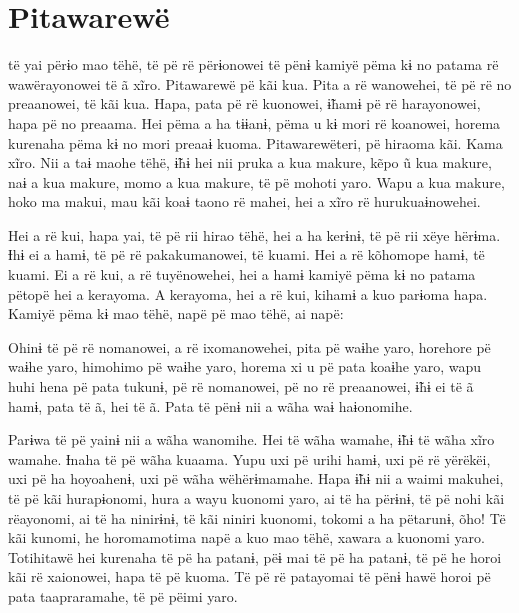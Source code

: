 \chapter{Pitawarewë}

 të yai përɨo mao tëhë, të pë rë përɨonowei të pënɨ kamiyë pëma
kɨ no patama rë wawërayonowei të ã xĩro. Pitawarewë pë kãi kua. Pita a
rë wanowehei, të pë rë no preaanowei, të kãi kua. Hapa, pata pë rë
kuonowei, ɨ̃hamɨ pë rë harayonowei, hapa pë no preaama. Hei pëma a ha
tɨɨanɨ, pëma u kɨ mori rë koanowei, horema kurenaha pëma kɨ no mori
preaaɨ kuoma. Pitawarewëteri, pë hiraoma kãi. Kama xĩro. Nii a taɨ maohe
tëhë, ɨ̃hɨ hei nii pruka a kua makure, kẽpo ũ kua makure, naɨ a kua
makure, momo a kua makure, të pë mohoti yaro. Wapu a kua makure, hoko ma
makui, mau kãi koaɨ taono rë mahei, hei a xĩro rë hurukuaɨnowehei. 


Hei a rë kui, hapa yai, të pë rii hirao tëhë, hei a ha kerɨnɨ, të pë rii
xëye hërɨma. Ɨhɨ ei a hamɨ, të pë rë pakakumanowei, të kuami. Hei a rë
kõhomope hamɨ, të kuami. Ei a rë kui, a rë tuyënowehei, hei a hamɨ
kamiyë pëma kɨ no patama pëtopë hei a kerayoma. A kerayoma, hei a rë
kui, kihamɨ a kuo parɨoma hapa. Kamiyë pëma kɨ mao tëhë, napë pë mao
tëhë, ai napë:


Ohinɨ të pë rë nomanowei, a rë ixomanowehei, pita pë waɨhe yaro,
horehore pë waɨhe yaro, himohimo pë waɨhe yaro, horema xi u pë pata
koaɨhe yaro, wapu huhi hena pë pata tukunɨ, pë rë nomanowei, pë no rë
preaanowei, ɨ̃hɨ ei të ã hamɨ, pata të ã, hei të ã. Pata të pënɨ nii a
wãha waɨ haɨonomihe. 

Parɨwa të pë yainɨ nii a wãha wanomihe. Hei të wãha wamahe, ɨ̃hɨ të wãha
xĩro wamahe. Ɨnaha të pë wãha kuaama. Yupu uxi pë urihi hamɨ, uxi pë rë
yërëkëi, uxi pë ha hoyoahenɨ, uxi pë wãha wëhërɨmamahe. Hapa ɨ̃hɨ nii a
waimi makuhei, të pë kãi hurapɨonomi, hura a wayu kuonomi yaro, ai të ha
përɨnɨ, të pë nohi kãi rëayonomi, ai të ha ninirɨnɨ, të kãi niniri
kuonomi, tokomi a ha pëtarunɨ, õho! Të kãi kunomi, he horomamotima napë
a kuo mao tëhë, xawara a kuonomi yaro. Totihitawë hei kurenaha të pë ha
patanɨ, pëɨ mai të pë ha patanɨ, të pë he horoi kãi rë xaionowei, hapa
të pë kuoma. Të pë rë patayomai të pënɨ hawë horoi pë pata taapraramahe,
të pë pëimi yaro. 

